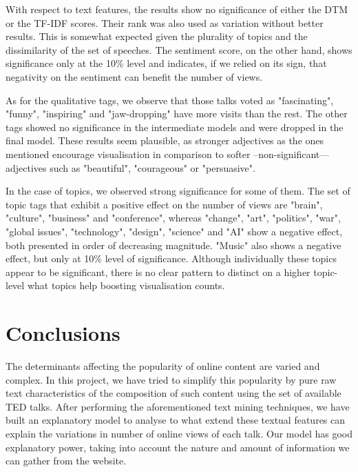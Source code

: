 \documentclass[a4paper, 11pt]{article} %
\begin{document}
With respect to text features, the results show no significance of either the DTM or the TF-IDF scores. Their rank was also used as variation without better results. This is somewhat expected given the plurality of topics and the dissimilarity of the set of speeches. The sentiment score, on the other hand, shows significance only at the 10\% level and indicates, if we relied on its sign, that negativity on the sentiment can benefit the number of views.

As for the qualitative tags, we observe that those talks voted as "fascinating", "funny", "inspiring" and "jaw-dropping" have more visits than the rest. The other tags showed no significance in the intermediate models and were dropped in the final model. These results seem plausible, as stronger adjectives as the ones mentioned encourage visualisation in comparison to softer --non-significant--- adjectives such as "beautiful", "courageous" or "persuasive".

In the case of topics, we observed strong significance for some of them. The set of topic tags that exhibit a positive effect on the number of views are "brain", "culture", "business" and "conference", whereas "change", "art", "politics", "war", "global issues", "technology", "design", "science" and "AI" show a negative effect, both presented in order of decreasing magnitude. "Music" also shows a negative effect, but only at 10\% level of significance. Although individually these topics appear to be significant, there is no clear pattern to distinct on a higher topic-level what topics help boosting visualisation counts.


\section*{Conclusions}

The determinants affecting the popularity of online content are varied and complex. In this project, we have tried to simplify this popularity by pure raw text characteristics of the composition of such content using the set of available TED talks. After performing the aforementioned text mining techniques, we have built an explanatory model to analyse to what extend these textual features can explain the variations in number of online views of each talk. Our model has good explanatory power, taking into account the nature and amount of information we can gather from the website.
\end{document}
